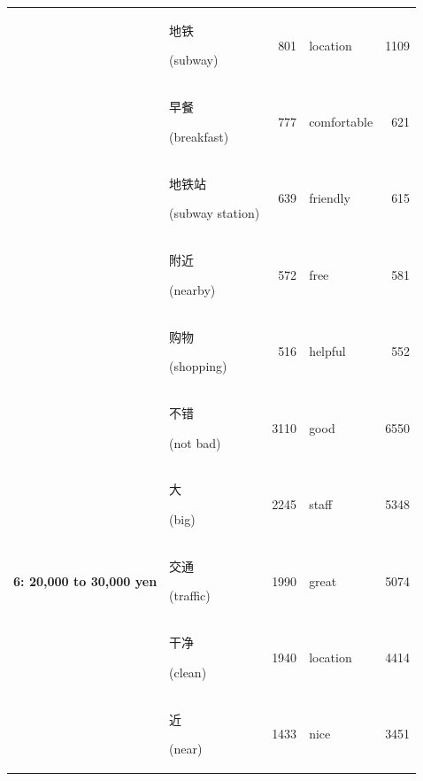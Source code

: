 \documentclass[smallextended,natbib]{svjour3}       %
\begin{document}
\begin{table}[ht]
{\begin{tabular}{|c|lr|lr|}
                                                             & \begin{CJK}{UTF8}{gbsn}地铁\end{CJK} (subway)          & 801   & location    & 1109  \\  
                                                             & \begin{CJK}{UTF8}{gbsn}早餐\end{CJK} (breakfast)       & 777   & comfortable & 621   \\  
                                                             & \begin{CJK}{UTF8}{gbsn}地铁站\end{CJK} (subway station) & 639   & friendly    & 615   \\  
                                                             & \begin{CJK}{UTF8}{gbsn}附近\end{CJK} (nearby)          & 572   & free        & 581   \\  
                                                             & \begin{CJK}{UTF8}{gbsn}购物\end{CJK} (shopping)        & 516   & helpful     & 552   \\ \hline
        \multirow{10}{*}{\textbf{6: 20,000 to 30,000 yen}}   & \begin{CJK}{UTF8}{gbsn}不错\end{CJK} (not bad)         & 3110  & good        & 6550  \\  
                                                             & \begin{CJK}{UTF8}{gbsn}大\end{CJK} (big)              & 2245  & staff       & 5348  \\  
                                                             & \begin{CJK}{UTF8}{gbsn}交通\end{CJK} (traffic)         & 1990  & great       & 5074  \\  
                                                             & \begin{CJK}{UTF8}{gbsn}干净\end{CJK} (clean)           & 1940  & location    & 4414  \\  
                                                             & \begin{CJK}{UTF8}{gbsn}近\end{CJK} (near)             & 1433  & nice        & 3451  \\  

\end{tabular}}
\end{table}
\end{document}
